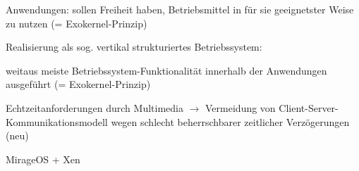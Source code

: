 \documentclass[a4paper]{article}
\begin{document}
\begin{multicols}{3}
\begin{itemize*}
\begin{enumerate*}
            \item Anwendungen: sollen Freiheit haben, Betriebsmittel in für sie geeignetster Weise zu nutzen (= Exokernel-Prinzip)
            \item Realisierung als sog. vertikal strukturiertes Betriebssystem: \begin{itemize*} \item weitaus meiste Betriebssystem-Funktionalität innerhalb der Anwendungen ausgeführt (= Exokernel-Prinzip) \item Echtzeitanforderungen durch Multimedia $\rightarrow$ Vermeidung von Client-Server-Kommunikationsmodell wegen schlecht beherrschbarer zeitlicher Verzögerungen (neu) \end{itemize*}
        \end{enumerate*}
    \end{itemize*}

    MirageOS + Xen


\end{multicols}
\end{document}

